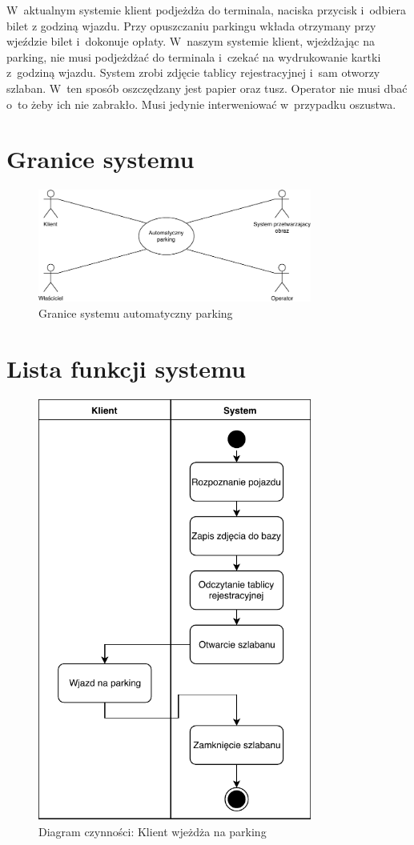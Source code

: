 W~aktualnym systemie klient podjeżdża do terminala, naciska przycisk i~odbiera bilet z godziną wjazdu. Przy opuszczaniu parkingu wkłada otrzymany przy wjeździe bilet i~dokonuje opłaty.
W~naszym systemie klient, wjeżdżając na parking, nie musi podjeżdżać do terminala i~czekać na wydrukowanie kartki z~godziną wjazdu. System zrobi zdjęcie tablicy rejestracyjnej i~sam otworzy szlaban. W~ten sposób oszczędzany jest papier oraz tusz. Operator nie musi dbać o~to żeby ich nie zabrakło. Musi jedynie interweniować w~przypadku oszustwa.


\section{Granice systemu}

\begin{figure}[H]
	\centering
	\includegraphics[width=90mm]{diagramy/graniceSystemu.pdf}
	\caption{Granice systemu automatyczny parking \label{overflow}}
\end{figure}

\section{Lista funkcji systemu}


\begin{figure}[H]
	\centering
	\includegraphics[width=90mm]{diagramy/DiagCzynWjazd.pdf}
	\caption{Diagram czynności: Klient wjeżdża na parking \label{overflow}}
\end{figure}


